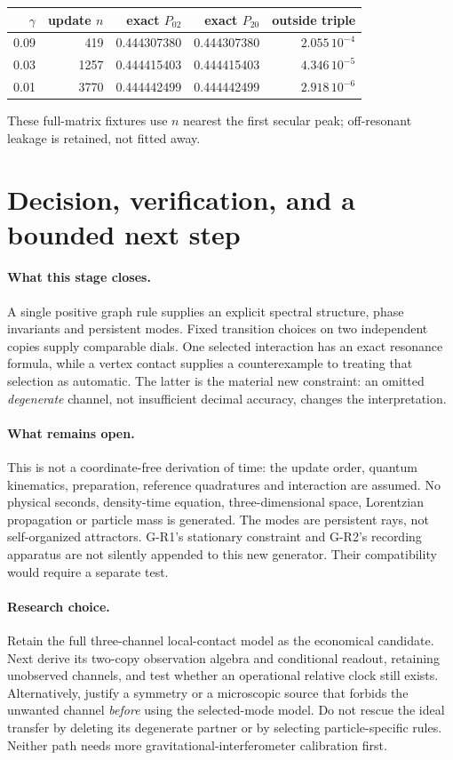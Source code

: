 \documentclass[11pt,a4paper]{article}
\begin{document}
\begin{center}
\begin{tabular}{rrrrr}\toprule
$\gamma$&update $n$&exact $P_{02}$&exact $P_{20}$&outside triple\\\midrule
0.09&419&0.444307380&0.444307380&$2.055\,10^{-4}$\\
0.03&1257&0.444415403&0.444415403&$4.346\,10^{-5}$\\
0.01&3770&0.444442499&0.444442499&$2.918\,10^{-6}$\\\bottomrule
\end{tabular}
\end{center}
These full-matrix fixtures use $n$ nearest the first secular peak;
off-resonant leakage is retained, not fitted away.

\newpage
\section{Decision, verification, and a bounded next step}
\paragraph{What this stage closes.}
A single positive graph rule supplies an explicit spectral structure,
phase invariants and persistent modes. Fixed transition choices on
two independent copies supply comparable dials. One selected interaction
has an exact resonance formula, while a vertex contact supplies a
counterexample to treating that selection as automatic. The latter is
the material new constraint: an omitted \emph{degenerate} channel, not
insufficient decimal accuracy, changes the interpretation.

\paragraph{What remains open.}
This is not a coordinate-free derivation of time: the update order,
quantum kinematics, preparation, reference quadratures and interaction
are assumed. No physical seconds, density-time equation, three-dimensional
space, Lorentzian propagation or particle mass is generated. The modes
are persistent rays, not self-organized attractors. G-R1's stationary
constraint and G-R2's recording apparatus are not silently appended to
this new generator. Their compatibility would require a separate test.

\paragraph{Research choice.}
Retain the full three-channel local-contact model as the economical
candidate. Next derive its two-copy observation algebra and conditional
readout, retaining unobserved channels, and test whether an operational
relative clock still exists. Alternatively, justify a symmetry or a
microscopic source that forbids the unwanted channel \emph{before}
using the selected-mode model. Do not rescue the ideal transfer by
deleting its degenerate partner or by selecting particle-specific rules.
Neither path needs more gravitational-interferometer calibration first.
\end{document}
